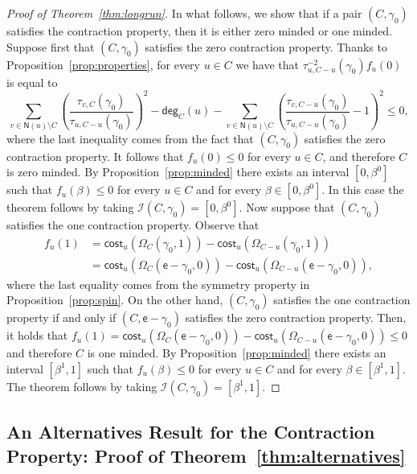 \documentclass[letterpaper,11pt]{article}
\newcommand{\nsf}{\mathsf{N}}
\newcommand{\cost}{\mathsf{cost}}
\newcommand{\degsf}{\mathsf{deg}}
\begin{document}
\begin{proof}[Proof of Theorem~\ref{thm:longrun}]
In what follows, we show that if a pair $(C,\gamma_0)$ satisfies the contraction property, then it is either zero minded or one minded. 
Suppose first that $(C,\gamma_0)$ satisfies the zero contraction property. 
Thanks to Proposition~\ref{prop:properties}, for every $u\in C$ we have that $\tau^{-2}_{u,C-u}(\gamma_0)f_u(0)$ is equal to
\begin{equation*}
\sum_{v\in \nsf(u)\setminus C}\left(\frac{\tau_{v,C}(\gamma_0)}{\tau_{u,C-u}(\gamma_0)}\right)^2-\degsf_C(u) - \sum_{v\in \nsf(u)\setminus C}\left(\frac{\tau_{v,C-u}(\gamma_0)}{\tau_{u,C-u}(\gamma_0)}-1\right)^2\le 0,
\end{equation*}
where the last inequality comes from the fact that $(C,\gamma_0)$ satisfies the zero contraction property.
It follows that $f_u(0)\le 0$ for every $u\in C$, and therefore $C$ is zero minded. 
By Proposition~\ref{prop:minded} there exists an interval $[0,\beta^0]$ such that $f_u(\beta)\le 0$ for every $u\in C$ and for every $\beta\in [0,\beta^0]$. 
In this case the theorem follows by taking $\mathcal{I}(C,\gamma_0)=[0,\beta^0]$.
Now suppose that $(C,\gamma_0)$ satisfies the one contraction property. 
Observe that 
\begin{align*}
f_u(1)&=\cost_u(\Omega_C(\gamma_0,1))-\cost_u(\Omega_{C-u}(\gamma_0,1))\\
&=\cost_u(\Omega_C(\mathsf{e}-\gamma_0,0))-\cost_u(\Omega_{C-u}(\mathsf{e}-\gamma_0,0)),
\end{align*}
where the last equality comes from the symmetry property in Proposition~\ref{prop:spin}.
On the other hand, $(C,\gamma_0)$ satisfies the one contraction property if and only if $(C,\mathsf{e}-\gamma_0)$ satisfies the zero contraction property. 
Then, it holds that $f_u(1)=\cost_u(\Omega_C(\mathsf{e}-\gamma_0,0))-\cost_u(\Omega_{C-u}(\mathsf{e}-\gamma_0,0))\le 0$ and therefore $C$ is one minded. 
By Proposition~\ref{prop:minded} there exists an interval $[\beta^1,1]$ such that $f_u(\beta)\le 0$ for every $u\in C$ and for every $\beta\in [\beta^1,1]$. 
The theorem follows by taking $\mathcal{I}(C,\gamma_0)=[\beta^1,1]$.
\end{proof}

\subsection{An Alternatives Result for the Contraction Property: Proof of Theorem~\ref{thm:alternatives}}
\end{document}
